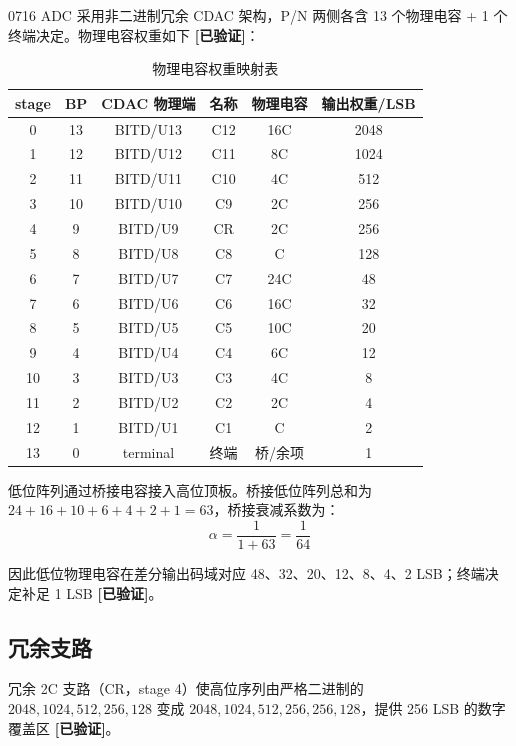 \documentclass[UTF8,a4paper,11pt]{ctexart}
\newcommand{\verified}{\textcolor{verifiedgreen}{\textbf{[已验证]}}}
\begin{document}
0716 ADC 采用非二进制冗余 CDAC 架构，P/N 两侧各含 13 个物理电容 + 1 个终端决定。物理电容权重如下 \verified：

\begin{table}[H]
\centering
\caption{物理电容权重映射表}
\label{tab:physical-weights}
\begin{tabular}{ccccc c}
\toprule
stage & BP & CDAC 物理端 & 名称 & 物理电容 & 输出权重/LSB \\
\midrule
0  & 13 & BITD/U13 & C12      & 16C & 2048 \\
1  & 12 & BITD/U12 & C11      & 8C  & 1024 \\
2  & 11 & BITD/U11 & C10      & 4C  & 512  \\
3  & 10 & BITD/U10 & C9       & 2C  & 256  \\
4  & 9  & BITD/U9  & CR       & 2C  & 256  \\
5  & 8  & BITD/U8  & C8       & C   & 128  \\
6  & 7  & BITD/U7  & C7       & 24C & 48   \\
7  & 6  & BITD/U6  & C6       & 16C & 32   \\
8  & 5  & BITD/U5  & C5       & 10C & 20   \\
9  & 4  & BITD/U4  & C4       & 6C  & 12   \\
10 & 3  & BITD/U3  & C3       & 4C  & 8    \\
11 & 2  & BITD/U2  & C2       & 2C  & 4    \\
12 & 1  & BITD/U1  & C1       & C   & 2    \\
13 & 0  & terminal & 终端     & 桥/余项 & 1 \\
\bottomrule
\end{tabular}
\end{table}

低位阵列通过桥接电容接入高位顶板。桥接低位阵列总和为 $24+16+10+6+4+2+1=63$，桥接衰减系数为：
\begin{equation}
\alpha = \frac{1}{1+63} = \frac{1}{64}
\label{eq:bridge-alpha}
\end{equation}

因此低位物理电容在差分输出码域对应 48、32、20、12、8、4、2 LSB；终端决定补足 1 LSB \verified。

\subsection{冗余支路}

冗余 2C 支路（CR，stage 4）使高位序列由严格二进制的 $2048, 1024, 512, 256, 128$ 变成 $2048, 1024, 512, 256, 256, 128$，提供 256 LSB 的数字覆盖区 \verified。
\end{document}
